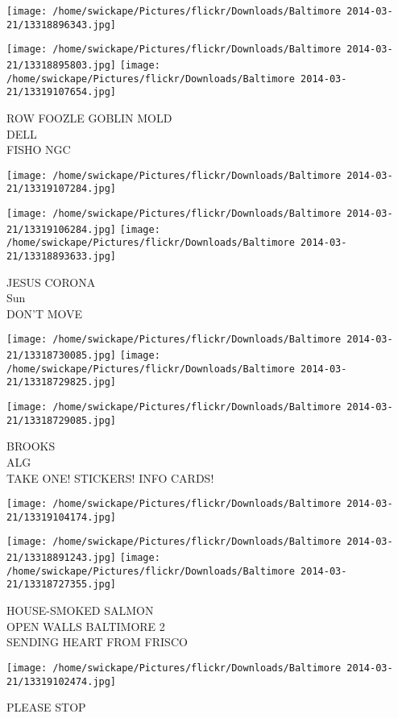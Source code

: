 \documentclass[10pt,letterpaper]{article}
\begin{document}
\texttt{[image: /home/swickape/Pictures/flickr/Downloads/Baltimore 2014-03-21/13318896343.jpg]}

\vspace{0.25in}
\texttt{[image: /home/swickape/Pictures/flickr/Downloads/Baltimore 2014-03-21/13318895803.jpg]}
\texttt{[image: /home/swickape/Pictures/flickr/Downloads/Baltimore 2014-03-21/13319107654.jpg]}

ROW FOOZLE GOBLIN MOLD\\
DELL\\
FISHO NGC\\
\pagebreak

\texttt{[image: /home/swickape/Pictures/flickr/Downloads/Baltimore 2014-03-21/13319107284.jpg]}

\vspace{0.25in}
\texttt{[image: /home/swickape/Pictures/flickr/Downloads/Baltimore 2014-03-21/13319106284.jpg]}
\texttt{[image: /home/swickape/Pictures/flickr/Downloads/Baltimore 2014-03-21/13318893633.jpg]}

JESUS CORONA\\
Sun\\
DON'T MOVE\\
\pagebreak

\texttt{[image: /home/swickape/Pictures/flickr/Downloads/Baltimore 2014-03-21/13318730085.jpg]}
\texttt{[image: /home/swickape/Pictures/flickr/Downloads/Baltimore 2014-03-21/13318729825.jpg]}

\texttt{[image: /home/swickape/Pictures/flickr/Downloads/Baltimore 2014-03-21/13318729085.jpg]}

BROOKS\\
ALG\\
TAKE ONE!  STICKERS!  INFO CARDS!\\
\pagebreak

\texttt{[image: /home/swickape/Pictures/flickr/Downloads/Baltimore 2014-03-21/13319104174.jpg]}

\vspace{0.25in}
\texttt{[image: /home/swickape/Pictures/flickr/Downloads/Baltimore 2014-03-21/13318891243.jpg]}
\texttt{[image: /home/swickape/Pictures/flickr/Downloads/Baltimore 2014-03-21/13318727355.jpg]}

HOUSE{-}SMOKED SALMON\\
OPEN WALLS BALTIMORE 2\\
SENDING HEART FROM FRISCO\\
\pagebreak

\texttt{[image: /home/swickape/Pictures/flickr/Downloads/Baltimore 2014-03-21/13319102474.jpg]}

PLEASE STOP\\
\pagebreak
\end{document}
